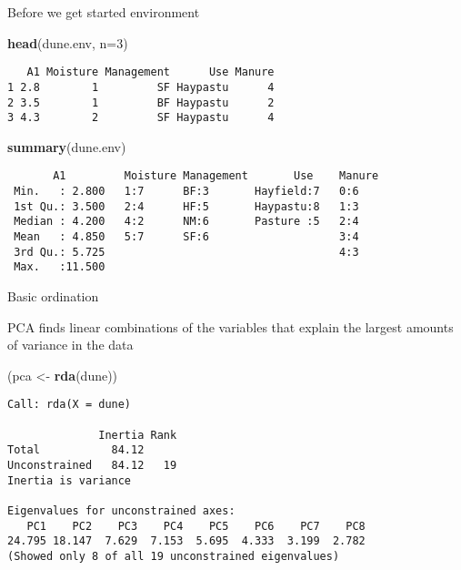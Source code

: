 \documentclass[10pt,ignorenonframetext,compress, aspectratio=169]{beamer}
\newenvironment{Shaded}{\begin{snugshade}}{\end{snugshade}}
\newcommand{\KeywordTok}[1]{\textcolor[rgb]{0.13,0.29,0.53}{\textbf{{#1}}}}
\newcommand{\DataTypeTok}[1]{\textcolor[rgb]{0.13,0.29,0.53}{{#1}}}
\newcommand{\DecValTok}[1]{\textcolor[rgb]{0.00,0.00,0.81}{{#1}}}
\newcommand{\StringTok}[1]{\textcolor[rgb]{0.31,0.60,0.02}{{#1}}}
\newcommand{\NormalTok}[1]{{#1}}
\begin{document}
\begin{frame}[fragile]{Before we get started \textbar{} environment}

\scriptsize

\begin{Shaded}
\begin{Highlighting}[]
\KeywordTok{head}\NormalTok{(dune.env, }\DataTypeTok{n=}\DecValTok{3}\NormalTok{)}
\end{Highlighting}
\end{Shaded}

\begin{verbatim}
   A1 Moisture Management      Use Manure
1 2.8        1         SF Haypastu      4
2 3.5        1         BF Haypastu      2
3 4.3        2         SF Haypastu      4
\end{verbatim}

\begin{Shaded}
\begin{Highlighting}[]
\KeywordTok{summary}\NormalTok{(dune.env)}
\end{Highlighting}
\end{Shaded}

\begin{verbatim}
       A1         Moisture Management       Use    Manure
 Min.   : 2.800   1:7      BF:3       Hayfield:7   0:6   
 1st Qu.: 3.500   2:4      HF:5       Haypastu:8   1:3   
 Median : 4.200   4:2      NM:6       Pasture :5   2:4   
 Mean   : 4.850   5:7      SF:6                    3:4   
 3rd Qu.: 5.725                                    4:3   
 Max.   :11.500                                          
\end{verbatim}

\normalsize

\end{frame}

\begin{frame}[fragile]{Basic ordination}

PCA finds linear combinations of the variables that explain the largest
amounts of variance in the data

\scriptsize

\begin{Shaded}
\begin{Highlighting}[]
\NormalTok{(pca <-}\StringTok{ }\KeywordTok{rda}\NormalTok{(dune))}
\end{Highlighting}
\end{Shaded}

\begin{verbatim}
Call: rda(X = dune)

              Inertia Rank
Total           84.12     
Unconstrained   84.12   19
Inertia is variance 

Eigenvalues for unconstrained axes:
   PC1    PC2    PC3    PC4    PC5    PC6    PC7    PC8 
24.795 18.147  7.629  7.153  5.695  4.333  3.199  2.782 
(Showed only 8 of all 19 unconstrained eigenvalues)
\end{verbatim}

\end{frame}
\end{document}
